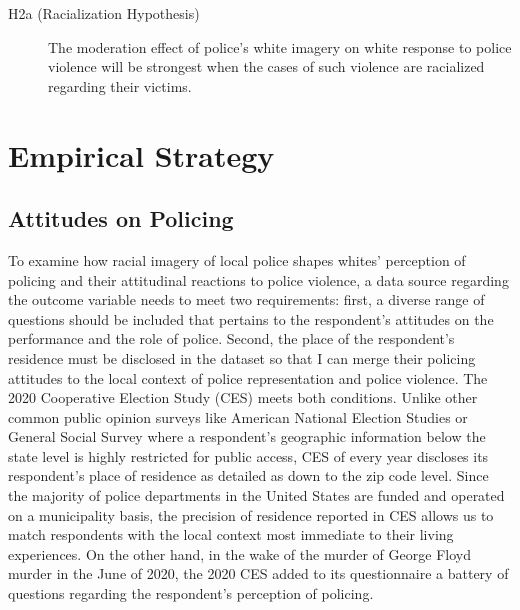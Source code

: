 \documentclass[
  12pt,
]{article}
\begin{document}
\begin{description}
\item[H2a (Racialization Hypothesis)]
The moderation effect of police's white imagery on white response to
police violence will be strongest when the cases of such violence are
racialized regarding their victims.
\end{description}

\hypertarget{empirical-strategy}{%
\section{Empirical Strategy}\label{empirical-strategy}}

\hypertarget{attitudes-on-policing}{%
\subsection{Attitudes on Policing}\label{attitudes-on-policing}}

To examine how racial imagery of local police shapes whites' perception
of policing and their attitudinal reactions to police violence, a data
source regarding the outcome variable needs to meet two requirements:
first, a diverse range of questions should be included that pertains to
the respondent's attitudes on the performance and the role of police.
Second, the place of the respondent's residence must be disclosed in the
dataset so that I can merge their policing attitudes to the local
context of police representation and police violence. The 2020
Cooperative Election Study (CES) meets both conditions. Unlike other
common public opinion surveys like American National Election Studies or
General Social Survey where a respondent's geographic information below
the state level is highly restricted for public access, CES of every
year discloses its respondent's place of residence as detailed as down
to the zip code level. Since the majority of police departments in the
United States are funded and operated on a municipality basis, the
precision of residence reported in CES allows us to match respondents
with the local context most immediate to their living experiences. On
the other hand, in the wake of the murder of George Floyd murder in the
June of 2020, the 2020 CES added to its questionnaire a battery of
questions regarding the respondent's perception of policing.
\end{document}

